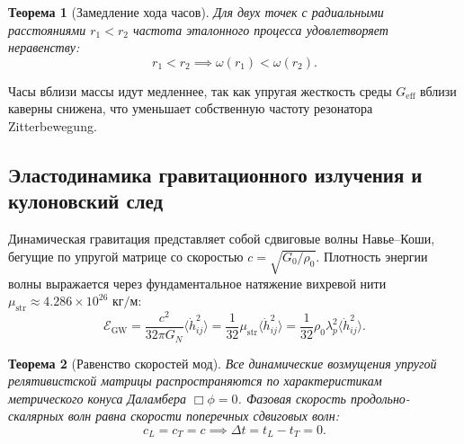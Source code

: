 \documentclass[11pt,a4paper]{article}
\newtheorem{theorem}{Теорема}
\theoremstyle{definition}
\theoremstyle{remark}
\begin{document}
\begin{theorem}[Замедление хода часов]
	\label{thm:gravitational_time_dilation}
	Для двух точек с радиальными расстояниями $r_1 < r_2$ частота эталонного процесса удовлетворяет неравенству:
	\begin{equation}
		r_1 < r_2 \implies \omega(r_1) < \omega(r_2).
		\label{eq:redshift_monotonicity}
	\end{equation}
\end{theorem}
Часы вблизи массы идут медленнее, так как упругая жесткость среды $G_{\mathrm{eff}}$ вблизи каверны снижена, что уменьшает собственную частоту резонатора Zitterbewegung.

\subsection{Эластодинамика гравитационного излучения и кулоновский след}

Динамическая гравитация представляет собой сдвиговые волны Навье--Коши, бегущие по упругой матрице со скоростью $c = \sqrt{G_0 / \rho_0}$. Плотность энергии волны выражается через фундаментальное натяжение вихревой нити $\mu_{\mathrm{str}} \approx 4.286 \times 10^{26}\text{ кг/м}$:
\begin{equation}
	\mathcal{E}_{\mathrm{GW}} = \frac{c^2}{32\pi G_N} \langle \dot{h}_{ij}^2 \rangle = \frac{1}{32} \mu_{\mathrm{str}} \langle \dot{h}_{ij}^2 \rangle = \frac{1}{32} \rho_0 \lambda_p^2 \langle \dot{h}_{ij}^2 \rangle.
	\label{eq:gw_energy_density_formula}
\end{equation}

\begin{theorem}[Равенство скоростей мод]
	\label{thm:gw_speed_equality}
	Все динамические возмущения упругой релятивистской матрицы распространяются по характеристикам метрического конуса Даламбера $\Box \phi = 0$. Фазовая скорость продольно-скалярных волн равна скорости поперечных сдвиговых волн:
	\begin{equation}
		c_L = c_T = c \implies \Delta t = t_L - t_T = 0.
		\label{eq:wave_speeds_equal}
	\end{equation}
\end{theorem}
\end{document}
